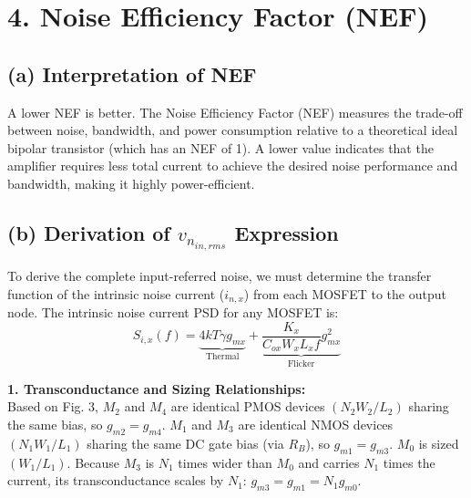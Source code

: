 \documentclass[12pt, a4paper]{article}
\begin{document}
\section*{4. Noise Efficiency Factor (NEF)}

\subsection*{(a) Interpretation of NEF}
A lower NEF is better. The Noise Efficiency Factor (NEF) measures the trade-off between noise, bandwidth, and power consumption relative to a theoretical ideal bipolar transistor (which has an NEF of 1). A lower value indicates that the amplifier requires less total current to achieve the desired noise performance and bandwidth, making it highly power-efficient.

\subsection*{(b) Derivation of $v_{n_{in,rms}}$ Expression}

To derive the complete input-referred noise, we must determine the transfer function of the intrinsic noise current ($i_{n,x}$) from each MOSFET to the output node. The intrinsic noise current PSD for any MOSFET is:
\begin{equation}
    S_{i,x}(f) = \underbrace{4kT\gamma g_{mx}}_{\text{Thermal}} + \underbrace{\frac{K_x}{C_{ox} W_x L_x f} g_{mx}^2}_{\text{Flicker}}
\end{equation}

\textbf{1. Transconductance and Sizing Relationships:}\\
Based on Fig. 3, $M_2$ and $M_4$ are identical PMOS devices $(N_2 W_2/L_2)$ sharing the same bias, so $g_{m2} = g_{m4}$. 
$M_1$ and $M_3$ are identical NMOS devices $(N_1 W_1/L_1)$ sharing the same DC gate bias (via $R_B$), so $g_{m1} = g_{m3}$. 
$M_0$ is sized $(W_1/L_1)$. Because $M_3$ is $N_1$ times wider than $M_0$ and carries $N_1$ times the current, its transconductance scales by $N_1$: $g_{m3} = g_{m1} = N_1 g_{m0}$.
\end{document}
